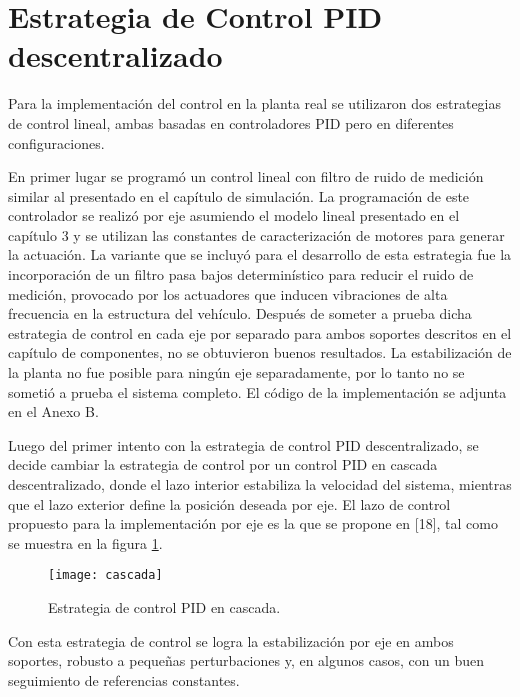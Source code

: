 \documentclass[../main.tex]{subfiles}
\begin{document}
\section{Estrategia de Control PID descentralizado}

Para la implementación del control en la planta real se utilizaron
dos estrategias de control lineal, ambas basadas en controladores
PID pero en diferentes configuraciones. 

En primer lugar se programó un control lineal con filtro de ruido
de medición similar al presentado en el capítulo de simulación. La
programación de este controlador se realizó por eje asumiendo el modelo
lineal presentado en el capítulo 3 y se utilizan las constantes
de caracterización de motores para generar la actuación. La variante
que se incluyó para el desarrollo de esta estrategia fue la incorporación
de un filtro pasa bajos determinístico para reducir el ruido de medición,
provocado por los actuadores que inducen vibraciones de alta frecuencia
en la estructura del vehículo. Después de someter a prueba dicha estrategia
de control en cada eje por separado para ambos soportes descritos
en el capítulo de componentes, no se obtuvieron buenos resultados.
La estabilización de la planta no fue posible para ningún eje separadamente,
por lo tanto no se sometió a prueba el sistema completo. El código
de la implementación se adjunta en el Anexo B.

Luego del primer intento con la estrategia de control PID descentralizado,
se decide cambiar la estrategia de control por un control PID en cascada
descentralizado, donde el lazo interior estabiliza la velocidad del
sistema, mientras que el lazo exterior define la posición deseada por
eje. El lazo de control propuesto para la implementación por eje es
la que se propone en [18], tal como se muestra en la figura \ref{pid cascada}.

\begin{figure}[H]
\noindent \begin{centering}
\texttt{[image: cascada]}
\par\end{centering}
\caption{Estrategia de control PID en cascada.}\label{pid cascada}\noindent
\end{figure}

Con esta estrategia de control se logra la estabilización por eje
en ambos soportes, robusto a pequeñas perturbaciones y, en algunos
casos, con un buen seguimiento de referencias constantes.
\end{document}
